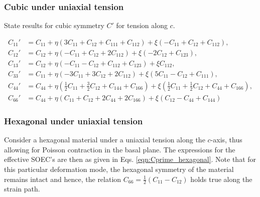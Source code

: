 \documentclass[showpacs,aps,floatfix,prb,reprint,superscriptaddress]{revtex4-1}
\begin{document}
\subsubsection{Cubic under uniaxial tension}
State results for cubic symmetry $C'$ for tension along $c$.
\begin{widetext}
\begin{subequations}
\label{eqn:Cprime_Cubic} 
\begin{align}
        C_{11}' &=C_{11} + \eta \left( 3C_{11} + C_{12} +C_{111} + C_{112}\right) + \xi \left(-C_{11} + C_{12} + C_{112} \right),\\
        C_{12}' &=C_{12} + \eta \left(-C_{11} + C_{12}  + 2C_{112}\right) + \xi \left(-2C_{12} + C_{123} \right),\\
				C_{13}' &=C_{12} + \eta \left(-C_{11}-C_{12} + C_{112} + C_{123} \right) + \xi C_{112},\\
				C_{33}' &=C_{11} + \eta \left( -3C_{11}+3C_{12} + 2 C_{112} \right) + \xi \left( 5C_{11} - C_{12} + C_{111}\right),\\
				C_{44}' &=C_{44} + \eta \left(\frac{1}{2} C_{11} + \frac{3}{2} C_{12} + C_{144} + C_{166} \right) + \xi \left(\frac{1}{2} C_{11} + \frac{1}{2} C_{12} + C_{44} + C_{166}  \right),\\
				C_{66}' &=C_{44} + \eta \left( C_{11} + C_{12} + 2C_{44} + 2C_{166} \right) + \xi \left(C_{12} - C_{44} + C_{144} \right)
\end{align}
\end{subequations}
\end{widetext} 

\subsubsection{Hexagonal under uniaxial tension}
Consider a hexagonal material under a uniaxial tension along the $c$-axis, thus allowing for Poisson contraction in the basal plane. The expressions for the effective SOEC's are then as given in Eqs. \ref{eqn:Cprime_hexagonal}. Note that for this particular deformation mode, the hexagonal symmetry of the material remains intact and hence, the relation $C_{66} = \frac{1}{2} \left(C_{11} - C_{12}\right)$ holds true along the strain path. 
\end{document}

